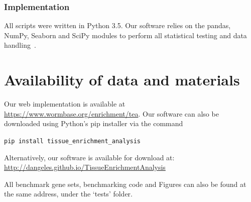 \documentclass{bmcart}
\begin{document}
\subsubsection*{Implementation}
All scripts were written in Python 3.5. Our software relies on the pandas, NumPy, Seaborn and SciPy modules to perform all statistical testing and data handling~\cite{McKinney2011, VanDerWalt2011, Oliphant2007}.


\section*{Availability of data and materials}
Our web implementation is available at \url{https://www.wormbase.org/enrichment/tea}. Our software can also be downloaded using Python's pip installer via the command

\texttt{pip install tissue\_enrichment\_analysis}

Alternatively, our software is available for download at: \url{http://dangeles.github.io/TissueEnrichmentAnalysis}

All benchmark gene sets, benchmarking code and Figures can also be found at the same address, under the `tests' folder.
\end{document}
